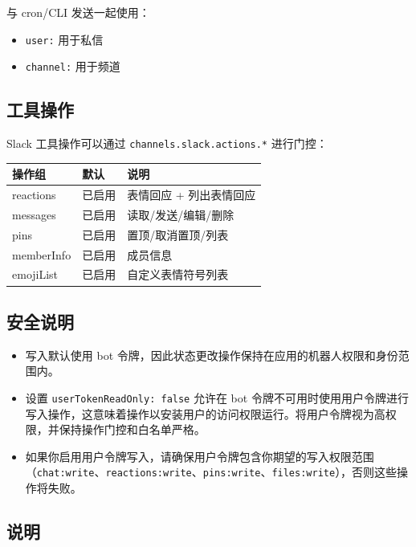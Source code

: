 与 cron/CLI 发送一起使用：

\begin{itemize}
  \item \texttt{user:} 用于私信
  \item \texttt{channel:} 用于频道
\end{itemize}


\subsection{工具操作}


Slack 工具操作可以通过 \texttt{channels.slack.actions.*} 进行门控：


\begin{table}[h]
\centering
\small
\begin{tabular}{|l|l|l|}
\hline
操作组 & 默认 & 说明 \\
\hline
reactions & 已启用 & 表情回应 + 列出表情回应 \\
\hline
messages & 已启用 & 读取/发送/编辑/删除 \\
\hline
pins & 已启用 & 置顶/取消置顶/列表 \\
\hline
memberInfo & 已启用 & 成员信息 \\
\hline
emojiList & 已启用 & 自定义表情符号列表 \\
\hline
\end{tabular}
\end{table}



\subsection{安全说明}


\begin{itemize}
  \item 写入默认使用 bot 令牌，因此状态更改操作保持在应用的机器人权限和身份范围内。
  \item 设置 \texttt{userTokenReadOnly: false} 允许在 bot 令牌不可用时使用用户令牌进行写入操作，这意味着操作以安装用户的访问权限运行。将用户令牌视为高权限，并保持操作门控和白名单严格。
  \item 如果你启用用户令牌写入，请确保用户令牌包含你期望的写入权限范围（\texttt{chat:write}、\texttt{reactions:write}、\texttt{pins:write}、\texttt{files:write}），否则这些操作将失败。
\end{itemize}


\subsection{说明}


